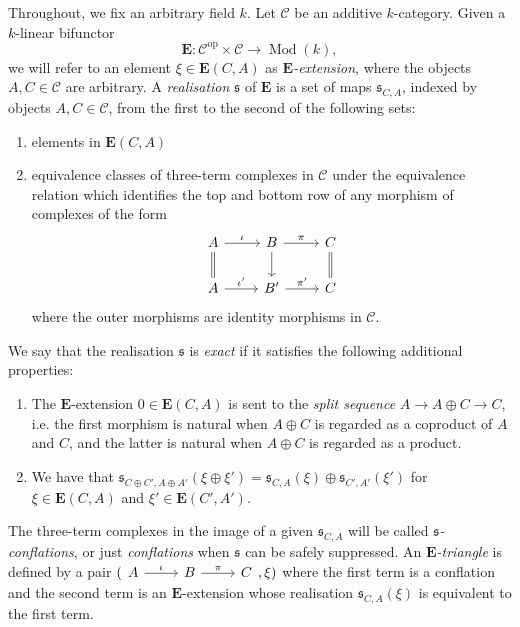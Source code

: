 \documentclass[10pt,twoside, a4paper,reqno]{amsart}
\newcommand{\op}{^{\mathrm{op}}}
\DeclareMathOperator{\Mod}{Mod}
\newcommand{\calC}{\mathcal{C}}
\newcommand{\E}{\mathbf{E}}
\theoremstyle{definition}
\begin{document}
Throughout, we fix an arbitrary field $k$.
Let $\calC$ be an additive $k$-category. Given a $k$-linear bifunctor 
\begin{equation}\label{eq:Eext_bifun}
    \E\colon \calC\op\times\calC \to \Mod(k),
\end{equation}
we will refer to an element $\xi\in \E(C,A)$ as \textit{$\E$-extension}, where the objects $A,C\in \calC$ are arbitrary. 
A \textit{realisation} {$\mathfrak{s}$} of $\E$ is a set of maps $\mathfrak{s}_{C,A}$, indexed by objects $A,C\in \calC$, from the first to the second of the following sets:
\begin{enumerate}
    \item elements in $\E(C,A)$
    \item\label{threecomplexes} equivalence classes of three-term complexes in $\calC$ under the equivalence relation {which identifies} the top and bottom row {of} any morphism of complexes of the form
\begin{equation*}
\begin{tikzcd}
A \arrow[r,"\iota"]\arrow[d,equal] & B\arrow[r,"\pi"]\arrow[d] & C\arrow[d,equal] \\ 
A \arrow[r,"\iota'"]  & B' \arrow[r,"\pi'"] & C
\end{tikzcd}
\end{equation*}
where the outer morphisms are identity morphisms in $\calC$.
\end{enumerate}
We say that the realisation $\mathfrak{s}$ is \textit{exact} if it  satisfies the following additional properties:
\begin{enumerate}
	\item\label{realiz1} The $\E$-extension $0\in \E(C,A)$ is sent to the \textit{split sequence} $A \to A\oplus C\to C$, i.e. the first morphism is natural when $A\oplus C$ is regarded as a coproduct of $A$ and $C$, and the latter is natural when $A\oplus C$ is regarded as a product.
	\item We have that $\mathfrak{s}_{C\oplus C',A\oplus A'}(\xi\oplus \xi') = \mathfrak{s}_{C,A}(\xi)\oplus \mathfrak{s}_{C',A'}(\xi')$ for $\xi\in \E(C,A)$ and $\xi'\in \E(C',A')$.
	 \end{enumerate}
The three-term {complexes} in the image of {a given} $\mathfrak{s}_{C,A}$ will be called \textit{$\mathfrak{s}$-conflations}, or just \textit{conflations} when $\mathfrak{s}$ can be safely suppressed. 
{An \textit{$\E$-triangle} is defined by a pair} $(\begin{tikzcd}
A \arrow[r,"\iota"]& B\arrow[r,"\pi"]& C
\end{tikzcd},\xi)$ {where the first term is {a conflation} and the second term is an $\E$-extension whose realisation $\mathfrak{s}_{C,A}(\xi)$ is equivalent to the first term.}
\end{document}
